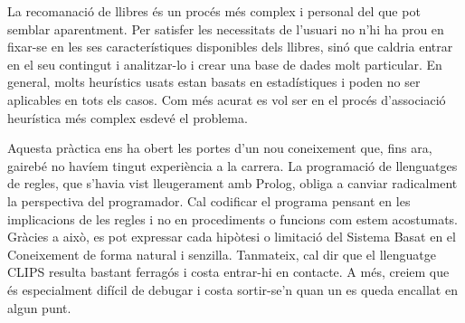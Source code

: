 
La recomanació de llibres és un procés més complex i personal del que pot semblar aparentment. Per satisfer les necessitats de l'usuari no n'hi ha prou en fixar-se en les ses característiques disponibles dels llibres, sinó que caldria entrar en el seu contingut i analitzar-lo i crear una base de dades molt particular. En general, molts heurístics usats estan basats en estadístiques i poden no ser aplicables en tots els casos. Com més acurat es vol ser en el procés d'associació heurística més complex esdevé el problema.

Aquesta pràctica ens ha obert les portes d'un nou coneixement que, fins ara, gairebé no havíem tingut experiència a la carrera. La programació de llenguatges de regles, que s'havia vist lleugerament amb Prolog, obliga a canviar radicalment la perspectiva del programador. Cal codificar el programa pensant en les implicacions de les regles i no en procediments o funcions com estem acostumats. Gràcies a això, es pot expressar cada hipòtesi o limitació del Sistema Basat en el Coneixement de forma natural i senzilla. Tanmateix, cal dir que el llenguatge CLIPS resulta bastant ferragós i costa entrar-hi en contacte. A més, creiem que és especialment difícil de debugar i costa sortir-se'n quan un es queda encallat en algun punt.



